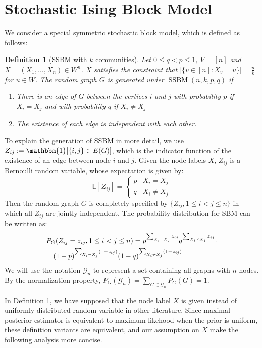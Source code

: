 \documentclass[journal]{IEEEtran}
\newtheorem{definition}{Definition}
\newcommand{\cG}{\mathcal{G}}
\DeclareMathOperator{\SSBM}{SSBM}
\begin{document}
\section{Stochastic Ising Block Model}\label{sec:sibm}
We consider a special symmetric stochastic block model, which is defined as follows:
	\begin{definition}[SSBM with $k$ communities] \label{def:SSBM}
	Let $0\leq q<p\leq 1$, $V=[n]$ and $X=(X_1,\dots,X_n)\in W^n$. $X$ satisfies the constraint that $|\{v \in [n] : X_v = u\}| = \frac{n}{k}$ for $u\in W$.
	The random graph $G$ is generated under $\SSBM(n,k,p,q)$ if
	\begin{enumerate}
	\item There is an edge of $G$ between the vertices $i$ and $j$ with probability $p$ if $X_i=X_j$ and with probability $q$ if $X_i \neq X_j$
	\item The existence of each edge is independent with each other.
	\end{enumerate}
\end{definition}
To explain the generation of SSBM in more detail,
we use $Z_{ij}:=\mathbbm{1}[\{i,j\} \in E(G)]$, which is the indicator function of the existence of an edge between node $i$ and $j$.
Given the node labels $X$, $Z_{ij}$ is a Bernoulli random variable, whose expectation is given by:
\begin{equation}
\mathbb{E}[Z_{ij}] =
\begin{cases}
p & X_i = X_j \\ 
q & X_i \neq X_j
\end{cases}
\end{equation}
Then the random graph $G$ is completely specified by $\{Z_{ij}, 1\leq i<j\leq n\}$ in which all $Z_{ij}$ are jointly independent.
The probability distribution for SBM can be written as:
\begin{align}
&P_G(Z_{ij} = z_{ij}, 1\leq i<j\leq n) = p^{\sum_{X_i = X_j} z_{ij}}q^{\sum_{X_i \neq X_j} z_{ij}} \cdot \notag \\
&\quad (1-p)^{\sum_{X_i = X_j} (1-z_{ij})}(1-q)^{\sum_{X_i \neq X_j} (1-z_{ij})}
\end{align}
We will use the notation $\cG_n$ to represent a set containing all graphs with $n$ nodes. By the normalization property,
$P_G(\cG_n) = \sum_{G\in \cG_n}P_G(G)=1$.

In Definition \ref{def:SSBM}, we have supposed that the node label $X$ is given instead of uniformly distributed random variable
in other literature. Since maximal posterior estimator is equivalent to maximum likehood when the prior is uniform,
these definition variants are equivalent, and our assumption on $X$ make the following analysis more concise.
\end{document}
